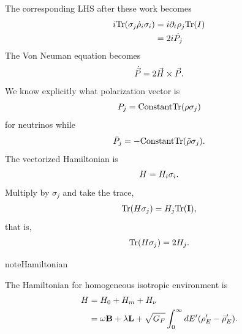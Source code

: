 \documentclass[letterpaper,12pt,english]{sphinxmanual}
\begin{document}
The corresponding LHS after these work becomes
\begin{gather}
\begin{split}i\mathrm{Tr}(\sigma_j \dot \rho_i \sigma_i) & = i \partial_t \rho_j \mathrm{Tr}( I) \\
& = 2i\dot{P_j}\end{split}\notag
\end{gather}
The Von Neuman equation becomes
\begin{gather}
\begin{split}\dot{\vec P} = 2 \vec H \times \vec P.\end{split}\notag
\end{gather}
We know explicitly what polarization vector is
\begin{gather}
\begin{split}P_j = \mathrm{Constant} \mathrm {Tr} (\rho \sigma_j)\end{split}\notag
\end{gather}
for neutrinos while
\begin{gather}
\begin{split}\bar P_j = -\mathrm{Constant} \mathrm {Tr} (\bar \rho \sigma_j).\end{split}\notag
\end{gather}
The vectorized Hamiltonian is
\begin{gather}
\begin{split}H = H_i\sigma_i.\end{split}\notag
\end{gather}
Multiply by \(\sigma_j\) and take the trace,
\begin{gather}
\begin{split}\mathrm{Tr}(H\sigma_j) = H_j \mathrm{Tr}(\mathbf I),\end{split}\notag
\end{gather}
that is,
\begin{gather}
\begin{split}\mathrm{Tr}(H\sigma_j) = 2 H_j.\end{split}\notag
\end{gather}
\begin{notice}{note}{Hamiltonian}

The Hamiltonian for homogeneous isotropic environment is
\begin{gather}
\begin{split}H &= H_0 + H_m + H_\nu \\
& = \omega \mathbf B + \lambda \mathbf L + \sqrt{ G_F} \int_0^\infty dE' (\rho_E' - \bar \rho_E' ).\end{split}\notag
\end{gather}\end{notice}
\end{document}
